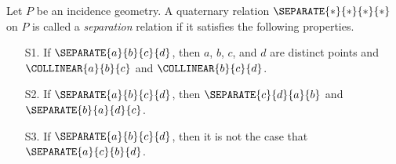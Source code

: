 \begin{dfn}[Separation]
Let \(P\) be an incidence geometry.
A quaternary relation \(\SEPARATE{\ast}{\ast}{\ast}{\ast}\) on \(P\) is called a \emph{separation} relation if it satisfies the following properties.
\begin{itemize}
\item[S1.] If \(\SEPARATE{a}{b}{c}{d}\), then \(a\), \(b\), \(c\), and \(d\) are distinct points and \(\COLLINEAR{a}{b}{c}\) and \(\COLLINEAR{b}{c}{d}\).
\item[S2.] If \(\SEPARATE{a}{b}{c}{d}\), then \(\SEPARATE{c}{d}{a}{b}\) and \(\SEPARATE{b}{a}{d}{c}\).
\item[S3.] If \(\SEPARATE{a}{b}{c}{d}\), then it is not the case that \(\SEPARATE{a}{c}{b}{d}\).
\end{itemize}
\end{dfn}